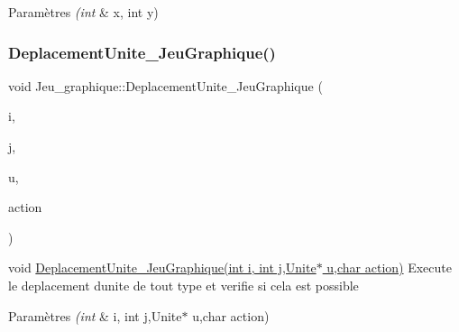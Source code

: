 \begin{DoxyParams}{Paramètres}
{\em (int} & x, int y) \\
\hline
\end{DoxyParams}
\mbox{\label{classJeu__graphique_acde0d8de2f0990f3ab3f2defe2c09c27}} 
\subsubsection{\texorpdfstring{Deplacement\+Unite\+\_\+\+Jeu\+Graphique()}{DeplacementUnite\_JeuGraphique()}}
{\footnotesize\ttfamily void Jeu\+\_\+graphique\+::\+Deplacement\+Unite\+\_\+\+Jeu\+Graphique (\begin{DoxyParamCaption}\item[{int}]{i,  }\item[{int}]{j,  }\item[{\hyperlink{classUnite}{Unite} $\ast$}]{u,  }\item[{char}]{action }\end{DoxyParamCaption})}



void \hyperlink{classJeu__graphique_acde0d8de2f0990f3ab3f2defe2c09c27}{Deplacement\+Unite\+\_\+\+Jeu\+Graphique(int i, int j,\+Unite$\ast$ u,char action)} Execute le deplacement d\textquotesingle{}unite de tout type et verifie si cela est possible 


\begin{DoxyParams}{Paramètres}
{\em (int} & i, int j,Unite$\ast$ u,char action) \\
\hline
\end{DoxyParams}
\mbox{\label{classJeu__graphique_abbcc5e26b8ac9f79716367883bfdb556}} 
